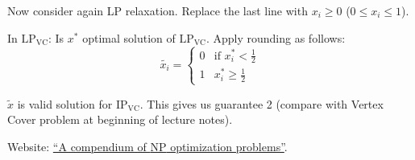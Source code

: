 \documentclass[a4paper]{article}
\newcommand{\cls}[1]{\rm{#1}}
\begin{document}
Now consider again LP relaxation. Replace the last line with
$x_i \geq 0$ ($0 \leq x_i \leq 1$).

In $\text{LP}_{\text{VC}}$:
Is $x^*$ optimal solution of $\text{LP}_{\text{VC}}$.
Apply rounding as follows:
\[
  \tilde{x_i} = \begin{cases}
    0 & \text{if } x_i^* < \frac12 \\
    1 & x_i^* \geq \frac12
  \end{cases}
\]

$\tilde{x}$ is valid solution for $\text{IP}_{\text{VC}}$.
This gives us guarantee 2 (compare with Vertex Cover problem at
beginning of lecture notes).

Website: \href{http://www.nada.kth.se/~viggo/wwwcompendium/}{``A compendium of \cls{NP} optimization problems''}.
\end{document}
